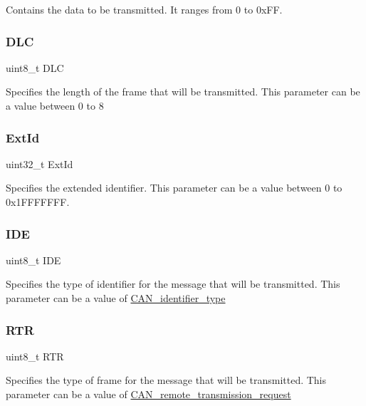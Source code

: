 Contains the data to be transmitted. It ranges from 0 to 0x\+FF. \mbox{\label{struct_can_tx_msg_a5f86974a53a85fb5706e08f8106296b9}} 
\subsubsection{\texorpdfstring{DLC}{DLC}}
{\footnotesize\ttfamily uint8\+\_\+t D\+LC}

Specifies the length of the frame that will be transmitted. This parameter can be a value between 0 to 8 \mbox{\label{struct_can_tx_msg_a8625d2aaf6b0b99f0faf0b8cd07debd4}} 
\subsubsection{\texorpdfstring{ExtId}{ExtId}}
{\footnotesize\ttfamily uint32\+\_\+t Ext\+Id}

Specifies the extended identifier. This parameter can be a value between 0 to 0x1\+F\+F\+F\+F\+F\+FF. \mbox{\label{struct_can_tx_msg_accecf260a60cf687f0f9898421aeea86}} 
\subsubsection{\texorpdfstring{IDE}{IDE}}
{\footnotesize\ttfamily uint8\+\_\+t I\+DE}

Specifies the type of identifier for the message that will be transmitted. This parameter can be a value of \mbox{\hyperlink{group___c_a_n__identifier__type}{C\+A\+N\+\_\+identifier\+\_\+type}} \mbox{\label{struct_can_tx_msg_a131e825d532b66f27dbb74aa80864d37}} 
\subsubsection{\texorpdfstring{RTR}{RTR}}
{\footnotesize\ttfamily uint8\+\_\+t R\+TR}

Specifies the type of frame for the message that will be transmitted. This parameter can be a value of \mbox{\hyperlink{group___c_a_n__remote__transmission__request}{C\+A\+N\+\_\+remote\+\_\+transmission\+\_\+request}} \mbox{\label{struct_can_tx_msg_a511131786af8d1534273e48ea2052245}} 
